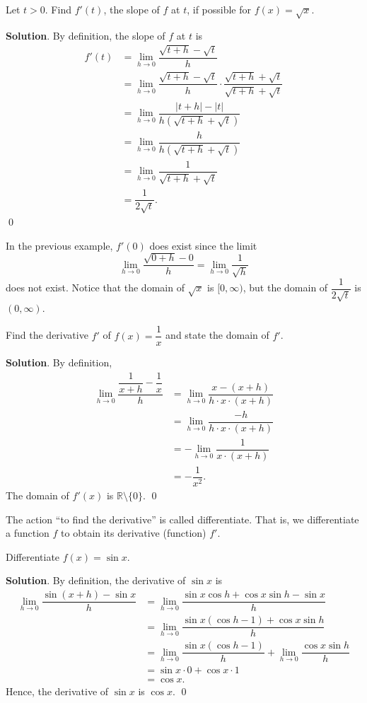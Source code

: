 \documentclass[11pt]{book}
\theoremstyle{break}
\theoremstyle{no_label}
\newcommand{\bbR}{\mathbb{R}}
\numberwithin{equation}{section}
\begin{document}
\begin{example}
    Let $t>0$. Find $f'(t)$, the slope of $f$ at $t$, if possible for $f(x)=\sqrt{x}$.
\end{example}
\textbf{Solution}. By definition, the slope of $f$ at $t$ is \begin{align*}
    f'(t)&=\lim_{h\to 0}\dfrac{\sqrt{t+h}-\sqrt{t}}{h}\\
    &=\lim_{h\to 0}\dfrac{\sqrt{t+h}-\sqrt{t}}{h}\cdot\dfrac{\sqrt{t+h}+\sqrt{t}}{\sqrt{t+h}+\sqrt{t}}\\
    &=\lim_{h\to 0}\dfrac{|t+h|-|t|}{h(\sqrt{t+h}+\sqrt{t})}\\
    &=\lim_{h\to 0}\dfrac{h}{h(\sqrt{t+h}+\sqrt{t})}\\
    &=\lim_{h\to 0}\dfrac{1}{\sqrt{t+h}+\sqrt{t}}\\
    &=\dfrac{1}{2\sqrt{t}}.
\end{align*} \qed

\begin{remark}
    In the previous example, $f'(0)$ does exist since the limit $$\lim_{h\to 0}\dfrac{\sqrt{0+h}-0}{h}=\lim_{h\to 0}\dfrac{1}{\sqrt{h}}$$ does not exist. Notice that the domain of $\sqrt{x}$ is $[0, \infty)$, but the domain of $\dfrac{1}{2\sqrt{t}}$ is $(0, \infty)$.
\end{remark}

\begin{example}
    Find the derivative $f'$ of $f(x)=\dfrac{1}{x}$ and state the domain of $f'$.
\end{example}
\textbf{Solution}. By definition, \begin{align*}
    \lim_{h\to 0}\dfrac{\dfrac{1}{x+h}-\dfrac{1}{x}}{h}&=\lim_{h\to 0}\dfrac{x-(x+h)}{h\cdot x\cdot(x+h)}\\
    &=\lim_{h\to 0}\dfrac{-h}{h\cdot x\cdot (x+h)}\\
    &=-\lim_{h\to 0}\dfrac{1}{x\cdot(x+h)}\\
    &=-\dfrac{1}{x^2}.
\end{align*} The domain of $f'(x)$ is $\bbR\setminus\{0\}$. \qed

\begin{remark}
    The action ``to find the derivative'' is called differentiate. That is, we differentiate a function $f$ to obtain its derivative (function) $f'$.
\end{remark}

\begin{example}
    Differentiate $f(x)=\sin x$.
\end{example}
\textbf{Solution}. By definition, the derivative of $\sin x$ is \begin{align*}
    \lim_{h\to 0}\dfrac{\sin(x+h)-\sin x}{h}&=\lim_{h\to 0}\dfrac{\sin x\cos h+\cos x\sin h-\sin x}{h}\\
    &=\lim_{h\to 0}\dfrac{\sin x(\cos h-1)+\cos x\sin h}{h}\\
    &=\lim_{h\to 0}\dfrac{\sin x(\cos h-1)}{h}+\lim_{h\to 0}\dfrac{\cos x\sin h}{h}\\
    &=\sin x\cdot 0+\cos x\cdot 1\\
    &=\cos x.
\end{align*}
Hence, the derivative of $\sin x$ is $\cos x$. \qed
\end{document}
